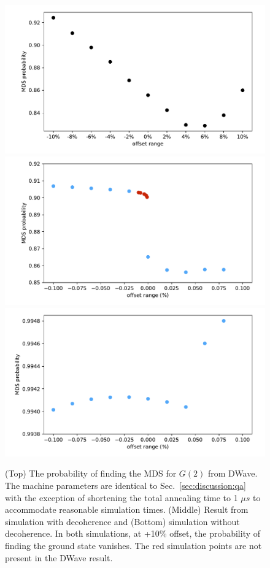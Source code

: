 \documentclass[prd,twocolumn,tightenlines,preprintnumbers,showpacs,superscriptaddress,notitlepage,nofootinbib,eqsecnum,floatfix,longbibliography]{revtex4}
\begin{document}
\begin{figure}
	\centering
	\includegraphics[width=\columnwidth]{./figures/dwave1us.pdf}
	\includegraphics[width=\columnwidth]{./figures/sim_deco.pdf}
	\includegraphics[width=\columnwidth]{./figures/sim_nodeco.pdf}
	\caption{ (Top) The probability of finding the MDS for $G(2)$ from DWave. The machine parameters are identical to Sec.~\ref{sec:discussion:qa} with the exception of shortening the total annealing time to 1 $\mu s$ to accommodate reasonable simulation times. (Middle) Result from simulation with decoherence and (Bottom) simulation without decoherence. In both simulations, at +10\% offset, the probability of finding the ground state vanishes. The red simulation points are not present in the DWave result.}
	\label{fig:dwave1us}
\end{figure}
\end{document}
